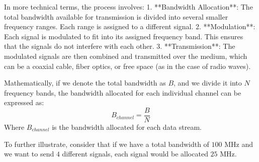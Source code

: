 In more technical terms, the process involves:
1. **Bandwidth Allocation**: The total bandwidth available for transmission is divided into several smaller frequency ranges. Each range is assigned to a different signal.
2. **Modulation**: Each signal is modulated to fit into its assigned frequency band. This ensures that the signals do not interfere with each other.
3. **Transmission**: The modulated signals are then combined and transmitted over the medium, which can be a coaxial cable, fiber optics, or free space (as in the case of radio waves).

Mathematically, if we denote the total bandwidth as \( B \), and we divide it into \( N \) frequency bands, the bandwidth allocated for each individual channel can be expressed as:
\[
B_{channel} = \frac{B}{N}
\]
Where \( B_{channel} \) is the bandwidth allocated for each data stream.

To further illustrate, consider that if we have a total bandwidth of \( 100 \) MHz and we want to send \( 4 \) different signals, each signal would be allocated \( 25 \) MHz.

